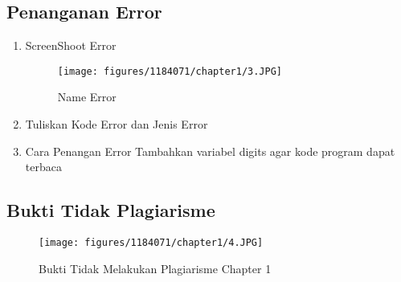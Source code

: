 	\subsection{Penanganan Error}
\begin{enumerate}
	\item ScreenShoot Error
	\begin{figure}[h]
		\texttt{[image: figures/1184071/chapter1/3.JPG]}
		\centering
		\caption{Name Error}
	\end{figure}
	\newpage\item Tuliskan Kode Error dan Jenis Error
	\hfill\break
	
\hfill\break
	\item Cara Penangan Error
\hfill\break Tambahkan variabel digits agar kode program dapat terbaca
	\end{enumerate}
	\subsection{Bukti Tidak Plagiarisme}
\begin{figure}[h]
	\texttt{[image: figures/1184071/chapter1/4.JPG]}
	\centering
	\caption{Bukti Tidak Melakukan Plagiarisme Chapter 1}
\end{figure}
